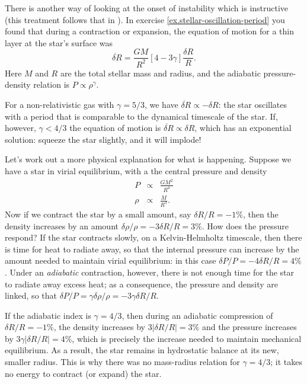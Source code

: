 \begin{sidebar}
There is another way of looking at the onset of instability which is instructive (this treatment follows that in \citet{Cox1980Theory-of-Stell}). In exercise \ref{ex.stellar-oscillation-period} you found that during a contraction or expansion, the equation of motion for a thin layer at the star's surface was
\[
	\ddot{\delta R} = \frac{GM}{R^{2}}\left[4-3\gamma\right]\frac{\delta R}{R}.
\]
Here $M$ and $R$ are the total stellar mass and radius, and the adiabatic pressure-density relation is $P\propto \rho^{\gamma}$.

For a non-relativistic gas with $\gamma = 5/3$, we have $\ddot{\delta R} \propto -\delta R$: the star oscillates with a period that is comparable to the dynamical timescale of the star. If, however, $\gamma < 4/3$ the equation of motion is $\ddot{\delta R} \propto \delta R$, which has an exponential solution: squeeze the star slightly, and it will implode!

Let's work out a more physical explanation for what is happening. Suppose we have a star in virial equilibrium, with a the central pressure and density
\begin{eqnarray*}
P &\propto& \frac{GM^{2}}{R^{4}} \\
\rho &\propto& \frac{M}{R^{3}}.
\end{eqnarray*}
Now if we contract the star by a small amount, say $\delta R/R = -1\%$, then the density increases by an amount $\delta\rho/\rho = -3\delta R/R = 3\%$. How does the pressure respond? If the star contracts slowly, on a Kelvin-Helmholtz timescale, then there is time for heat to radiate away, so that the internal pressure can increase by the amount needed to maintain virial equilibrium: in this case $\delta P/P = -4\delta R/R = 4\%$. Under an \emph{adiabatic} contraction, however, there is not enough time for the star to radiate away excess heat; as a consequence, the pressure and density are linked, so that $\delta P/P = \gamma\delta \rho/\rho = -3\gamma\delta R/R$.

If the adiabatic index is $\gamma = 4/3$, then during an adiabatic compression of $\delta R/R = -1\%$, the density increases by $3|\delta R/R| = 3\%$ and the pressure increases by $3\gamma|\delta R/R| = 4\%$, which is precisely the increase needed to maintain mechanical equilibrium. As a result, the star remains in hydrostatic balance at its new, smaller radius. This is why there was no mass-radius relation for $\gamma = 4/3$; it takes no energy to contract (or expand) the star.


\end{sidebar}

